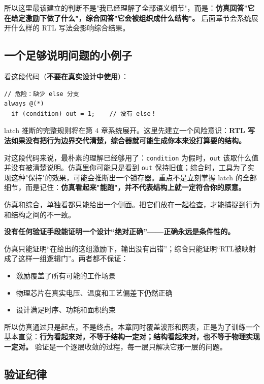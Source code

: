 \documentclass[11pt,a4paper]{article}
\begin{document}
所以这里最该建立的判断不是"我已经理解了全部语义细节"，而是：\textbf{仿真回答"它在给定激励下做了什么"，综合回答"它会被组织成什么结构"。} 后面章节会系统展开什么样的 RTL 写法会影响综合结果。

\subsection{一个足够说明问题的小例子}

看这段代码（\textbf{不要在真实设计中使用}）：

\begin{lstlisting}[style=shell]
// 危险：缺少 else 分支
always @(*)
  if (condition) out = 1;    // 没有 else！
\end{lstlisting}

latch 推断的完整规则将在第 4 章系统展开。这里先建立一个风险意识：\textbf{RTL 写法如果没有把行为边界交代清楚，综合器就可能生成你本来没打算要的结构。}

对这段代码来说，最朴素的理解已经够用了：\texttt{condition} 为假时，\texttt{out} 该取什么值并没有被清楚说明。仿真里你可能只是看到 \texttt{out} 保持旧值；综合时，工具为了实现这种"保持"的效果，可能会推断出一个锁存器。重点不是立刻掌握 latch 的全部细节，而是记住：\textbf{仿真看起来"能跑"，并不代表结构上就一定符合你的原意。}

仿真和综合，单独看都只能给出一个侧面。把它们放在一起检查，才能捕捉到行为和结构之间的不一致。

\begin{warnbox}
\textbf{没有任何验证手段能证明一个设计``绝对正确''——正确永远是条件性的。}

仿真只能证明``在给出的这组激励下，输出没有出错''；综合只能证明``RTL被映射成了这样一组逻辑门''。两者都不保证：
\begin{itemize}
  \item 激励覆盖了所有可能的工作场景
  \item 物理芯片在真实电压、温度和工艺偏差下仍然正确
  \item 设计满足时序、功耗和面积约束
\end{itemize}

所以仿真通过只是起点，不是终点。本章同时覆盖波形和网表，正是为了训练一个基本直觉：\textbf{行为看起来对，不等于结构一定对；结构看起来对，也不等于物理实现一定对。} 验证是一个逐层收敛的过程，每一层只解决它那一层的问题。
\end{warnbox}

\subsection{验证纪律}
\end{document}
